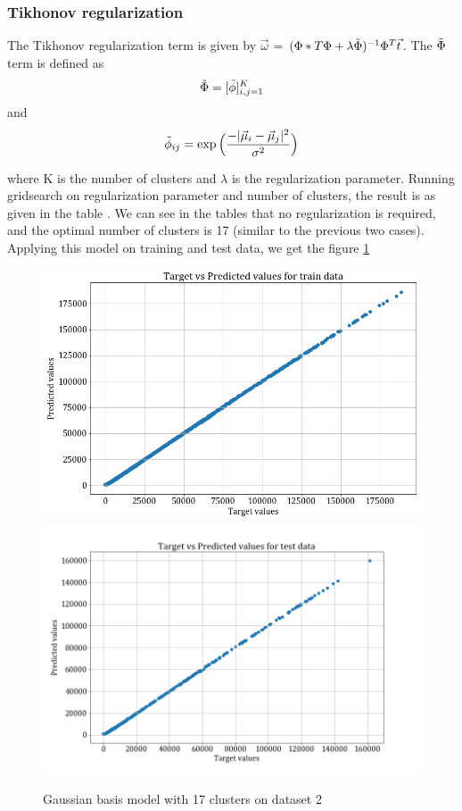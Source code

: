 \documentclass[12pt,a4paper]{article}
\begin{document}
\subsubsection{Tikhonov regularization}
The Tikhonov regularization term is given by $\vec{\omega}$ = $(\Phi*T\Phi + \lambda \Tilde{\Phi})^{-1} \Phi^T \vec{t}$. The $\Tilde{\Phi}$ term is defined as 
\begin{equation}
    \Tilde{\Phi} = [\Tilde{\phi}]_{i,j = 1}^{K}
\end{equation}
and 
\begin{equation}
    \Tilde{\phi}_{ij} =  \exp\Big(\frac{-|\vec{\mu}_i - \vec{\mu}_j|^2}{\sigma^2}\Big)
\end{equation}

where K is the number of clusters and $\lambda$ is the regularization parameter. 
Running gridsearch on regularization parameter and number of clusters, the result is as given in the table 
.
We can see in the tables that no regularization is required, and the optimal number of clusters is 17 (similar to the previous two cases).
Applying this model on training and test data, we get the figure \ref{fig:gaus_ds2_tikh}
\begin{figure}
    \centering
    \includegraphics[scale=0.25]{images/train_ds2_tikhreg.png}
    \includegraphics[scale=0.25]{images/test_ds2_tikhreg.png}
    \caption{Gaussian basis model with 17 clusters on dataset 2}
    \label{fig:gaus_ds2_tikh}
\end{figure}
\end{document}

